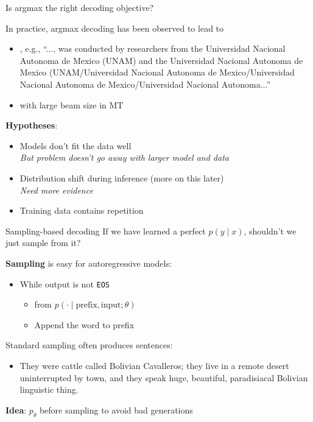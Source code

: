 \documentclass[usenames,dvipsnames,notes,11pt,aspectratio=169,hyperref={colorlinks=true, linkcolor=blue}]{beamer}
\begin{document}
\begin{frame}
    {Is argmax the right decoding objective?}

    In practice, argmax decoding has been observed to lead to\\
    \begin{itemize}
        \item {}, e.g., 
            {\small
                ``..., was conducted by researchers from the Universidad Nacional Autonoma de Mexico (UNAM) and {the Universidad Nacional Autonoma de Mexico (UNAM/Universidad Nacional Autonoma de Mexico/Universidad Nacional Autonoma de Mexico/Universidad Nacional Autonoma...}''}
            \item {} with large beam size in MT
    \end{itemize}

    \pause
    {\bf Hypotheses}:\\
    \begin{itemize}
        \item Models don't fit the data well \\
            {\em But problem doesn't go away with larger model and data}
        \item Distribution shift during inference (more on this later)\\
            {\em Need more evidence}
        \item Training data contains repetition
    \end{itemize}
\end{frame}

\begin{frame}
    {Sampling-based decoding}
    If we have learned a perfect $p(y\mid x)$, shouldn't we just sample from it?
    \pause

    \textbf{Sampling} is easy for autoregressive models:\\
    \begin{itemize}
        \item While output is not \texttt{EOS}
            \begin{itemize}
                \item {} from $p(\cdot\mid \text{prefix}, \text{input};\theta)$
                \item Append the word to prefix
            \end{itemize}
    \end{itemize}

    \pause
    Standard sampling often produces  sentences:\\
    \begin{itemize}
        \item[] {\footnotesize They were cattle called Bolivian Cavalleros; they live in a remote desert uninterrupted by town, and they speak huge, beautiful, paradisiacal Bolivian linguistic thing.}
    \end{itemize}

    \textbf{Idea}:  $p_\theta$ before sampling to avoid bad generations 
\end{frame}
\end{document}
